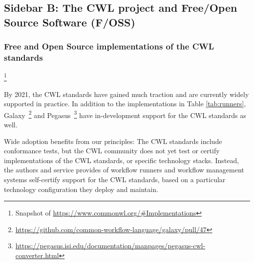 \documentclass[sigconf,revew,screen,timestamp,nonacm]{acmart}
\newcommand{\addition}[1]{{\color{brown} #1}}
\newcommand{\modification}[1]{{\color{blue} #1}}
\begin{document}
\subsection{Sidebar B: The CWL \addition{project} and Free/Open Source Software (F/OSS)}\label{sec:sidebar:b}

\subsubsection{Free and Open Source implementations of \addition{the} CWL \addition{standards}}\footnote{Snapshot of \url{https://www.commonwl.org/\#Implementations}}

By 2021, \modification{the CWL standards have} gained much traction and \modification{are} currently widely supported in practice. In addition to the implementations in Table \ref{tab:runners}, Galaxy~\cite{afgan_galaxy_2018}\footnote{\url{https://github.com/common-workflow-language/galaxy/pull/47}} and Pegasus~\cite{deelman_pegasus_2015}\footnote{\url{https://pegasus.isi.edu/documentation/manpages/pegasus-cwl-converter.html}} have in-development support for \modification{the CWL standards} as well.

Wide adoption benefits from our principles: \modification{The CWL standards} include conformance tests, but the CWL community does not yet test or certify \modification{implementations of the CWL standards}, or specific technology stacks. Instead, \modification{the authors and service provides of workflow runners and workflow management systems} self-certify support for the CWL standards, based on a particular technology configuration they deploy and maintain.
\end{document}

